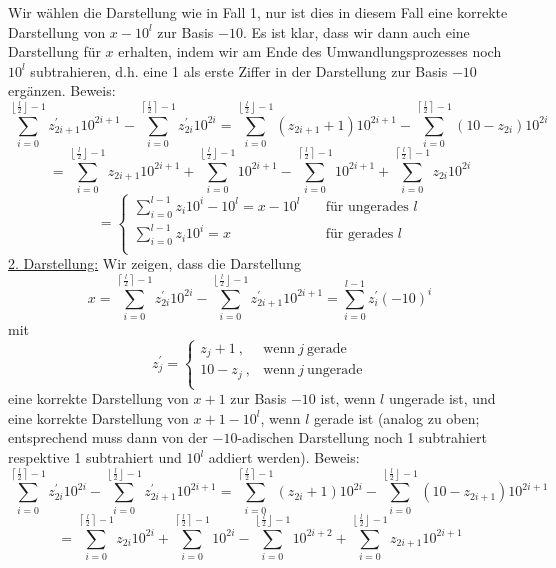 \documentclass[11pt]{scrartcl}
\theoremstyle{dotless}
\newcommand{\floor}[1]{\left\lfloor #1\right\rfloor}
\newcommand{\ceil}[1]{\left\lceil #1\right\rceil}
\begin{document}
		Wir wählen die Darstellung wie in Fall 1, nur ist dies in diesem Fall eine korrekte Darstellung von $x-10^l$ zur Basis $-10$. Es ist klar, dass wir dann auch eine Darstellung für $x$ erhalten, indem wir am Ende des Umwandlungsprozesses noch $10^l$ subtrahieren, d.h. eine 1 als erste Ziffer in der Darstellung zur Basis $-10$ ergänzen.\newline
		Beweis:\newline
		$$\sum_{i=0}^{\floor{\frac{l}{2}}-1}z_{2i+1}^{\prime} 10^{2i+1}-\sum_{i=0}^{\ceil{\frac{l}{2}}-1}z_{2i}^{\prime} 10^{2i}=\sum_{i=0}^{\floor{\frac{l}{2}}-1}(z_{2i+1}+1) 10^{2i+1}-\sum_{i=0}^{\ceil{\frac{l}{2}}-1}(10-z_{2i})10^{2i}$$
		$$=\sum_{i=0}^{\floor{\frac{l}{2}}-1}z_{2i+1} 10^{2i+1}+\sum_{i=0}^{\floor{\frac{l}{2}}-1} 10^{2i+1}-\sum_{i=0}^{\ceil{\frac{l}{2}}-1} 10^{2i+1}+\sum_{i=0}^{\ceil{\frac{l}{2}}-1}z_{2i} 10^{2i}$$
		$$=\left\{\begin{array}{ll}
		\sum_{i=0}^{l-1}z_i10^i-10^{l}=x-10^{l}\quad&\text{für ungerades }l\\
		\sum_{i=0}^{l-1}z_i10^i=x\quad&\text{für gerades }l\\
		\end{array}\right.
		$$
		\underline{2. Darstellung:}\newline
		Wir zeigen, dass die Darstellung
		$$x=\sum_{i=0}^{\ceil{\frac{l}{2}}-1}z_{2i}^{\prime} 10^{2i}-\sum_{i=0}^{\floor{\frac{l}{2}}-1}z_{2i+1}^{\prime} 10^{2i+1}=\sum_{i=0}^{l-1}z_{i}^{\prime} (-10)^{i}$$
		mit
		$$z_j^{\prime}=\left\{\begin{array}{ll}
		z_j+1~,& \text{wenn}~j~ \text{gerade}\\
		10-z_j~,&\text{wenn}~j~ \text{ungerade}\\
		\end{array}\right.$$
		eine korrekte Darstellung von $x+1$ zur Basis $-10$ ist, wenn $l$ ungerade ist, und eine korrekte Darstellung von $x+1-10^l$, wenn $l$ gerade ist (analog zu oben; entsprechend muss dann von der $-10$-adischen Darstellung noch 1 subtrahiert respektive 1 subtrahiert und $10^l$ addiert werden).\newline
		Beweis:
		$$\sum_{i=0}^{\ceil{\frac{l}{2}}-1}z_{2i}^{\prime} 10^{2i}-\sum_{i=0}^{\floor{\frac{l}{2}}-1}z_{2i+1}^{\prime} 10^{2i+1}=\sum_{i=0}^{\ceil{\frac{l}{2}}-1}(z_{2i}+1) 10^{2i}-\sum_{i=0}^{\floor{\frac{l}{2}}-1}(10-z_{2i+1}) 10^{2i+1}$$
		$$=\sum_{i=0}^{\ceil{\frac{l}{2}}-1}z_{2i} 10^{2i} + \sum_{i=0}^{\ceil{\frac{l}{2}}-1} 10^{2i} - \sum_{i=0}^{\floor{\frac{l}{2}}-1} 10^{2i+2} + \sum_{i=0}^{\floor{\frac{l}{2}}-1}z_{2i+1} 10^{2i+1}$$
\end{document}
